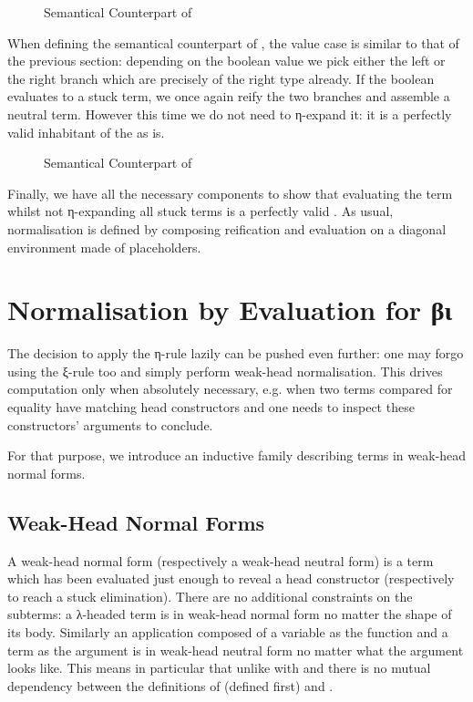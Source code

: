 \begin{figure}[h]
\caption{Semantical Counterpart of }
\end{figure}

When defining the semantical counterpart of , the value case is similar to
that of the previous section: depending on the boolean value we pick either the left
or the right branch which are precisely of the right type already. If the boolean
evaluates to a stuck term, we once again reify the two branches and assemble a neutral
term. However this time we do not need to η-expand it: it is a perfectly valid inhabitant
of the  as is.

\begin{figure}[h]
\caption{Semantical Counterpart of }
\end{figure}

Finally, we have all the necessary components to show that evaluating
the term whilst not η-expanding all stuck terms is a perfectly valid
. As usual, normalisation is defined by composing
reification and evaluation on a diagonal environment made of placeholders.


\section{Normalisation by Evaluation for βι}

The decision to apply the η-rule lazily can be pushed even further: one may
forgo using the ξ-rule too and simply perform weak-head normalisation. This
drives computation only when absolutely necessary, e.g.
when two terms compared for equality have matching head constructors
and one needs to inspect these constructors' arguments to conclude.

For that purpose, we introduce an inductive family describing terms in weak-head
normal forms.

\subsection{Weak-Head Normal Forms}

A weak-head normal form (respectively a weak-head neutral form) is a term which has
been evaluated just enough to reveal a head constructor (respectively to reach a
stuck elimination). There are no additional constraints on the subterms: a λ-headed
term is in weak-head normal form no matter the shape of its body. Similarly an
application composed of a variable as the function and a term as the argument is in
weak-head neutral form no matter what the argument looks like. This means in particular
that unlike with  and  there is no mutual dependency between the definitions
of  (defined first) and .

